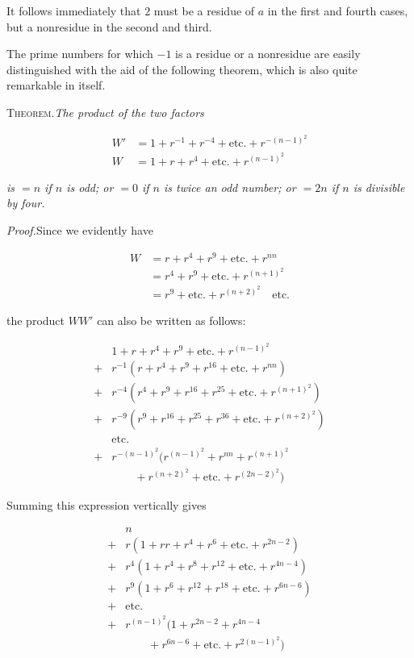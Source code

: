 It follows immediately that $2$ must be a residue of $a$ in the first and fourth cases, but a nonresidue in the second and third.



The prime numbers for which $-1$ is a residue or a nonresidue are easily distinguished with the aid of the following theorem, which is also quite remarkable in itself.

\textsc{Theorem.}\quad \textit{The product of the two factors}

\[
\begin{aligned}
W'&=1+r^{-1}+r^{-4}+\text{etc.}+r^{-(n-1)^2}\\
W&=1+r+r^4+\text{etc.}+r^{(n-1)^2}
\end{aligned}
\]

\textit{is $=n$ if $n$ is odd; or $=0$ if $n$ is twice an odd number; or $=2n$ if $n$ is divisible by four.}

\textit{Proof.}\quad Since we evidently have

\[
\begin{aligned}
W&=r+r^4+r^9+\text{etc.}+r^{nn}\\
&=r^4+r^9+\text{etc.}+r^{(n+1)^2}\\
&=r^9+\text{etc.}+r^{(n+2)^2}\quad\text{etc.}
\end{aligned}
\]

the product $WW'$ can also be written as follows:

\[
\begin{aligned}
&1+r+r^4+r^9+\text{etc.}+r^{(n-1)^2}\\
+{}&r^{-1}(r+r^4+r^9+r^{16}+\text{etc.}+r^{nn})\\
+{}&r^{-4}(r^4+r^9+r^{16}+r^{25}+\text{etc.}+r^{(n+1)^2})\\
+{}&r^{-9}(r^9+r^{16}+r^{25}+r^{36}+\text{etc.}+r^{(n+2)^2})\\
&\text{etc.}\\
+{}&r^{-(n-1)^2}(r^{(n-1)^2}+r^{nn}+r^{(n+1)^2}\\&\qquad+r^{(n+2)^2}+\text{etc.}+r^{(2n-2)^2})
\end{aligned}
\]

Summing this expression vertically gives

\[
\begin{aligned}
&n\\
+{}&r(1+rr+r^4+r^6+\text{etc.}+r^{2n-2})\\
+{}&r^4(1+r^4+r^8+r^{12}+\text{etc.}+r^{4n-4})\\
+{}&r^9(1+r^6+r^{12}+r^{18}+\text{etc.}+r^{6n-6})\\
+{}&\text{etc.}\\
+{}&r^{(n-1)^2}(1+r^{2n-2}+r^{4n-4}\\&\qquad+r^{6n-6}+\text{etc.}+r^{2(n-1)^2})
\end{aligned}
\]

